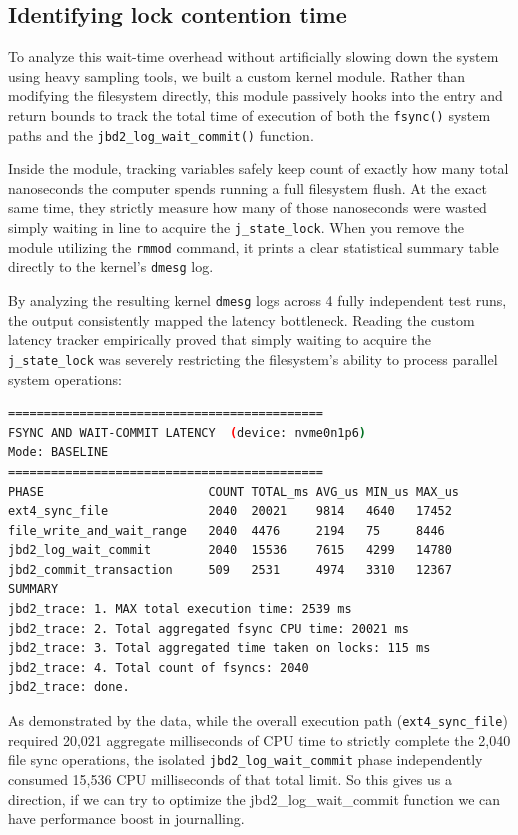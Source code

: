 \documentclass[12pt,a4paper]{article}
\begin{document}
\subsection{Identifying lock contention time}

To analyze this wait-time overhead without artificially slowing down the system using heavy sampling tools, we built a custom kernel module. Rather than modifying the filesystem directly, this module passively hooks into the entry and return bounds to track the total time of execution of both the \texttt{fsync()} system paths and the \texttt{jbd2\_log\_wait\_commit()} function.

Inside the module, tracking variables safely keep count of exactly how many total nanoseconds the computer spends running a full filesystem flush. At the exact same time, they strictly measure how many of those nanoseconds were wasted simply waiting in line to acquire the \texttt{j\_state\_lock}. When you remove the module utilizing the \texttt{rmmod} command, it prints a clear statistical summary table directly to the kernel's \texttt{dmesg} log.

By analyzing the resulting kernel \texttt{dmesg} logs across 4 fully independent test runs, the output consistently mapped the latency bottleneck. Reading the custom latency tracker empirically proved that simply waiting to acquire the \texttt{j\_state\_lock} was severely restricting the filesystem's ability to process parallel system operations:

\begin{lstlisting}[caption={Sample \texttt{dmesg} kernel ring buffer output from the latency tracker on \texttt{rmmod}.},language=bash]
============================================
FSYNC AND WAIT-COMMIT LATENCY  (device: nvme0n1p6)
Mode: BASELINE
============================================
PHASE                       COUNT TOTAL_ms AVG_us MIN_us MAX_us
ext4_sync_file              2040  20021    9814   4640   17452
file_write_and_wait_range   2040  4476     2194   75     8446
jbd2_log_wait_commit        2040  15536    7615   4299   14780
jbd2_commit_transaction     509   2531     4974   3310   12367
SUMMARY
jbd2_trace: 1. MAX total execution time: 2539 ms
jbd2_trace: 2. Total aggregated fsync CPU time: 20021 ms
jbd2_trace: 3. Total aggregated time taken on locks: 115 ms
jbd2_trace: 4. Total count of fsyncs: 2040
jbd2_trace: done.
\end{lstlisting}

As demonstrated by the data, while the overall execution path (\texttt{ext4\_sync\_file}) required 20,021 aggregate milliseconds of CPU time to strictly complete the 2,040 file sync operations, the isolated \texttt{jbd2\_log\_wait\_commit} phase independently consumed 15,536 CPU milliseconds of that total limit. So this gives us a direction, if we can try to optimize the jbd2\_log\_wait\_commit function we can have performance boost in journalling. 
\end{document}
